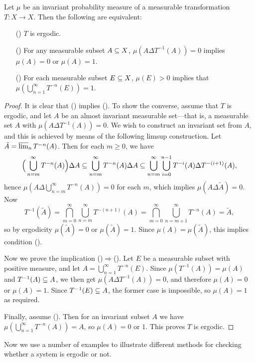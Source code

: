 \begin{proposition}\label{ergodic iff preimage has full measure}
Let $\mu$ be an invariant probability measure of a measurable transformation $T:X\to X$. Then the following are equivalent:
\begin{itemize}
\item[(\rmnum{1})] $T$ is ergodic.
\item[(\rmnum{2})] For any measurable subset $A\subseteq X$, $\mu(A\Delta T^{-1}(A))=0$ implies $\mu(A)=0$ or $\mu(A)=1$.
\item[(\rmnum{3})] For each measurable subset $E\subseteq X$, $\mu(E)>0$ implies that $\mu(\bigcup_{n=1}^{\infty}T^{-n}(E))=1$.
\end{itemize}
\end{proposition}
\begin{proof}
It is clear that () implies (). To show the converse, assume that $T$ is ergodic, and let $A$ be an almost invariant measurable set---that is, a measurable set $A$ with $\mu(A\Delta T^{-1}(A))=0$. We wish to construct an invariant set from $A$, and this is achieved by means of the following limsup construction. Let $\tilde{A}=\varlimsup_nT^{-n}(A)$. Then for each $m\geq 0$, we have
\[\Big(\bigcup_{n=m}^{\infty}T^{-n}(A)\Big)\Delta A\subseteq\bigcup_{n=m}^{\infty}T^{-n}(A)\Delta A\subseteq\bigcup_{n=m}^{\infty}\bigcup_{i=0}^{n-1}T^{-i}(A)\Delta T^{-(i+1)}(A),\]
hence $\mu(A\Delta\bigcup_{n=m}^{\infty}T^{-n}(A))=0$ for each $m$, which implies $\mu(A\Delta\tilde{A})=0$. Now
\[T^{-1}(\tilde{A})=\bigcap_{m=0}^{\infty}\bigcup_{n=m}^{\infty}T^{-(n+1)}(A)=\bigcap_{m=0}^{\infty}\bigcup_{n=m+1}^{\infty}T^{-n}(A)=\tilde{A},\]
so by ergodicity $\mu(\tilde{A})=0$ or $\mu(\tilde{A})=1$. Since $\mu(A)=\mu(\tilde{A})$, this implies condition ().\par
Now we prove the implication ()$\Rightarrow$(). Let $E$ be a measurable subset with positive measure, and let $A=\bigcup_{n=1}^{\infty}T^{-n}(E)$. Since $\mu(T^{-1}(A))=\mu(A)$ and $T^{-1}(A)\subseteq A$, we then get $\mu(A\Delta T^{-1}(A))=0$, and therefore $\mu(A)=0$ or $\mu(A)=1$. Since $T^{-1}(E)\subseteq A$, the former case is impossible, so $\mu(A)=1$ as required.\par
Finally, assume (). Then for an invariant subset $A$ we have $\mu(\bigcup_{n=1}^{\infty}T^{-n}(A))=A$, so $\mu(A)=0$ or $1$. This proves $T$ is ergodic.
\end{proof}
Now we use a number of examples to illustrate different methods for checking whether a system is ergodic or not.
